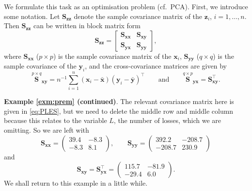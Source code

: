 \documentclass[]{book}
\theoremstyle{definition}
\theoremstyle{definition}
\theoremstyle{definition}
\theoremstyle{remark}
\begin{document}
We formulate this task as an optimisation problem (cf.~PCA). First, we introduce some notation. Let \(\boldsymbol S_{\boldsymbol z\boldsymbol z}\) denote the sample covariance matrix of the \(\boldsymbol z_i\), \(i=1,\ldots, n\). Then \(\boldsymbol S_{\boldsymbol z\boldsymbol z}\) can be written in block matrix form
\[
\boldsymbol S_{\boldsymbol z\boldsymbol z}=\left [\begin{array}{cc}
\boldsymbol S_{\boldsymbol x\boldsymbol x} & \boldsymbol S_{\boldsymbol x\boldsymbol y}\\
\boldsymbol S_{\boldsymbol y\boldsymbol x} & \boldsymbol S_{\boldsymbol y\boldsymbol y} \end{array} \right ],
\]
where \(\boldsymbol S_{\boldsymbol x\boldsymbol x}\) (\(p \times p\)) is the sample covariance matrix of the \(\boldsymbol x_i\), \(\boldsymbol S_{\boldsymbol y\boldsymbol y}\) (\(q \times q\)) is the sample covariance of the \(\boldsymbol y_i\), and the cross-covariance matrices are given by
\[
\stackrel{p \times q}{\boldsymbol S}_{\boldsymbol x\boldsymbol y}=n^{-1} \sum_{i=1}^n (\boldsymbol x_i -\bar{\boldsymbol x})(\boldsymbol y_i-\bar{\boldsymbol y})^\top
\qquad \text{and} \qquad \stackrel{q \times p}{\boldsymbol S}_{\boldsymbol y\boldsymbol x}=\boldsymbol S_{\boldsymbol x\boldsymbol y}^\top.
\]

\textbf{Example \ref{exm:prem} (continued)}. The relevant covariance matrix here is given in \eqref{eq:PLES},
but we need to delete the middle row and middle column because this relates to the variable \(L\), the number of losses,
which we are omitting. So we are left with
\begin{equation}
\boldsymbol S_{\boldsymbol x\boldsymbol x}=\begin{pmatrix} 39.4 & -8.3\\ -8.3 & 8.1   \end{pmatrix} , \qquad
\boldsymbol S_{\boldsymbol y\boldsymbol y}=\begin{pmatrix} 392.2 & -208.7\\ -208.7 & 230.9   \end{pmatrix}
\label{eq:bSxy1}
\end{equation}
and
\begin{equation}
\boldsymbol S_{\boldsymbol x\boldsymbol y}=\boldsymbol S_{\boldsymbol y\boldsymbol x}^\top =
\begin{pmatrix} 115.7  & -81.9\\ -29.4 & 6.0   \end{pmatrix}.
\label{eq:bSxy2}
\end{equation}
We shall return to this example in a little while.
\end{document}
